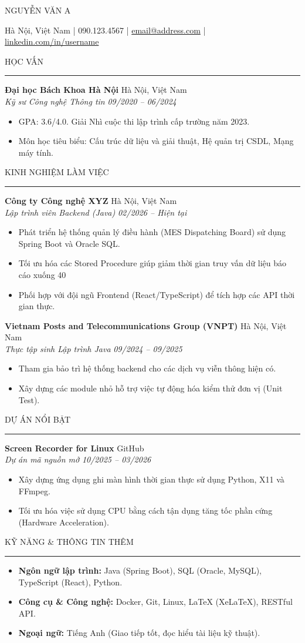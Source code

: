 \documentclass[11pt,a4paper]{article}
\newcommand{\name}[1]{{\huge \bfseries \centerline{#1} \vspace{4pt}}}
\newcommand{\contact}[1]{{\centerline{#1} \vspace{10pt}}}
\newcommand{\sectiontitle}[1]{{\vspace{8pt} \bfseries \strut \MakeUppercase{#1} \hrule \vspace{4pt}}}
\newcommand{\entry}[4]{
  \noindent \textbf{#1} \hfill #2 \\
  \noindent \textit{#3} \hfill \textit{#4} \vspace{2pt}
}
\begin{document}
\pagestyle{empty}

\name{NGUYỄN VĂN A}
\contact{Hà Nội, Việt Nam | 090.123.4567 | \href{mailto:email@address.com}{email@address.com} | \href{https://linkedin.com/in/yourprofile}{linkedin.com/in/username}}

\sectiontitle{Học vấn}
\entry{Đại học Bách Khoa Hà Nội}{Hà Nội, Việt Nam}{Kỹ sư Công nghệ Thông tin}{09/2020 -- 06/2024}
\begin{itemize}
    \item GPA: 3.6/4.0. Giải Nhì cuộc thi lập trình cấp trường năm 2023.
    \item Môn học tiêu biểu: Cấu trúc dữ liệu và giải thuật, Hệ quản trị CSDL, Mạng máy tính.
\end{itemize}

\sectiontitle{Kinh nghiệm làm việc}
\entry{Công ty Công nghệ XYZ}{Hà Nội, Việt Nam}{Lập trình viên Backend (Java)}{02/2026 -- Hiện tại}
\begin{itemize}
    \item Phát triển hệ thống quản lý điều hành (MES Dispatching Board) sử dụng Spring Boot và Oracle SQL.
    \item Tối ưu hóa các Stored Procedure giúp giảm thời gian truy vấn dữ liệu báo cáo xuống 40%
    \item Phối hợp với đội ngũ Frontend (React/TypeScript) để tích hợp các API thời gian thực.
\end{itemize}

\vspace{6pt}

\entry{Vietnam Posts and Telecommunications Group (VNPT)}{Hà Nội, Việt Nam}{Thực tập sinh Lập trình Java}{09/2024 -- 09/2025}
\begin{itemize}
    \item Tham gia bảo trì hệ thống backend cho các dịch vụ viễn thông hiện có.
    \item Xây dựng các module nhỏ hỗ trợ việc tự động hóa kiểm thử đơn vị (Unit Test).
\end{itemize}

\sectiontitle{Dự án nổi bật}
\entry{Screen Recorder for Linux}{GitHub}{Dự án mã nguồn mở}{10/2025 -- 03/2026}
\begin{itemize}
    \item Xây dựng ứng dụng ghi màn hình thời gian thực sử dụng Python, X11 và FFmpeg.
    \item Tối ưu hóa việc sử dụng CPU bằng cách tận dụng tăng tốc phần cứng (Hardware Acceleration).
\end{itemize}

\sectiontitle{Kỹ năng \& Thông tin thêm}
\begin{itemize}
    \item \textbf{Ngôn ngữ lập trình:} Java (Spring Boot), SQL (Oracle, MySQL), TypeScript (React), Python.
    \item \textbf{Công cụ \& Công nghệ:} Docker, Git, Linux, LaTeX (XeLaTeX), RESTful API.
    \item \textbf{Ngoại ngữ:} Tiếng Anh (Giao tiếp tốt, đọc hiểu tài liệu kỹ thuật).
\end{itemize}
\end{document}
